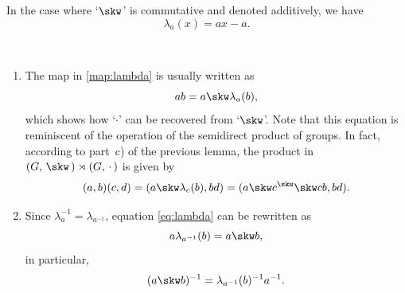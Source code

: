 \begin{rem}
    In the case where `$\skw$' is commutative and denoted additively, we have
    $$
        \lambda_a(x) = ax - a.
    $$
\end{rem}

\begin{rems}${}$
    \begin{enumerate}[-]
        \item The map in \eqref{map:lambda} is usually written as
        \begin{equation}\label{eq:lambda}
            ab = a\skw\lambda_a(b),
        \end{equation}
        which shows how `$\cdot$' can be recovered from `$\skw$'. Note that this equation is reminiscent of the operation of the semidirect product of groups. In fact, according to part~c) of the previous lemma, the product in $(G,\,\skw\,)\rtimes(G,\,\cdot\,)$ is given by
        $$
            (a,b)(c,d) = (a\skw\lambda_c(b), bd)
                = (a\skw c^\skw\skw cb, bd).
        $$
        \item Since $\lambda_a^{-1}=\lambda_{a^{-1}}$, equation \eqref{eq:lambda} can be rewritten as
        \begin{equation}\label{eq:lambda-inverse}
            a\lambda_{a^{-1}}(b) = a\skw b,
        \end{equation}
        in particular,
        \begin{equation}\label{eq:lambda-inverse-of-cdot}
            (a\skw b)^{-1} = \lambda_{a^{-1}}(b)^{-1}a^{-1}.
        \end{equation}
    \end{enumerate}
\end{rems}

